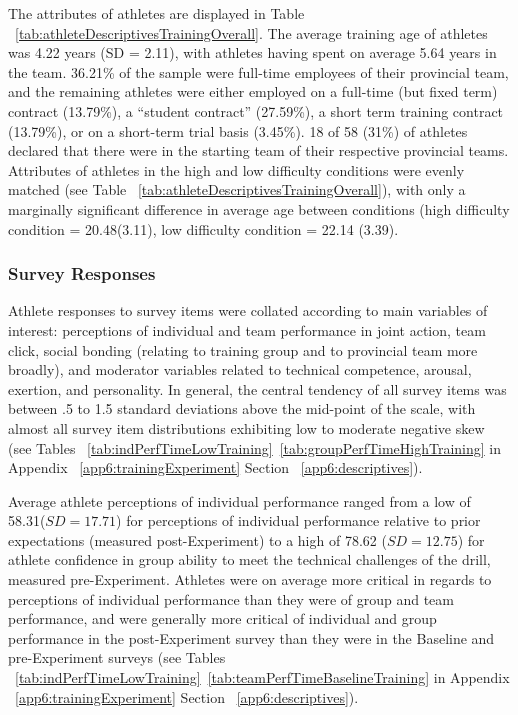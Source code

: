 The attributes of athletes are displayed in Table ~\ref{tab:athleteDescriptivesTrainingOverall}. The average training age of athletes was 4.22 years (SD = 2.11), with athletes having spent on average 5.64 years in the team. 36.21\% of the sample were full-time employees of their provincial team, and the remaining athletes were either employed on a full-time (but fixed term) contract
(13.79\%), a ``student contract'' (27.59\%), a short term training contract (13.79\%), or on a short-term trial basis (3.45\%).  18 of 58 (31\%) of athletes declared that there were in the starting team of their respective provincial teams.
Attributes of athletes in the high and low difficulty conditions were evenly matched (see Table ~\ref{tab:athleteDescriptivesTrainingOverall}), with only a marginally significant difference in average age between conditions (high difficulty condition = 20.48(3.11), low difficulty condition = 22.14 (3.39).

\subsubsection{Survey Responses\label{sec:surveyResponses}}
Athlete responses to survey items were collated according to main variables of interest: perceptions of individual and team performance in joint action, team click, social bonding (relating to training group and to provincial team more broadly), and moderator variables related to technical competence, arousal, exertion, and personality. In general, the central tendency of all survey items was between .5 to 1.5 standard deviations above the mid-point of the scale, with almost all survey item distributions exhibiting low to moderate negative skew (see Tables ~\ref{tab:indPerfTimeLowTraining}\nobreakdash~\ref{tab:groupPerfTimeHighTraining} in Appendix ~\ref{app6:trainingExperiment} Section ~\ref{app6:descriptives}).

Average athlete perceptions of individual performance ranged from a low of 58.31($SD = 17.71$) for perceptions of individual performance relative to prior expectations (measured post-Experiment) to a high of 78.62 ($SD = 12.75$) for athlete confidence in group ability to meet the technical challenges of the drill, measured pre-Experiment.  Athletes were on average more critical in regards to perceptions of individual performance than they were of group and team performance, and were generally more critical of individual and group performance in the post-Experiment survey than they were in the Baseline and pre-Experiment surveys (see Tables ~\ref{tab:indPerfTimeLowTraining}\nobreakdash~\ref{tab:teamPerfTimeBaselineTraining} in Appendix ~\ref{app6:trainingExperiment} Section ~\ref{app6:descriptives}).


